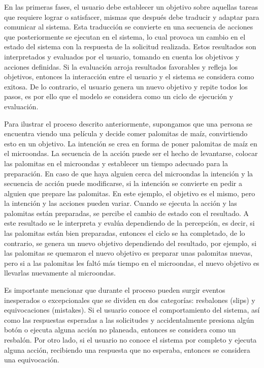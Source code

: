 En las primeras fases, el usuario debe establecer un objetivo sobre aquellas tareas que requiere lograr o satisfacer, mismas que después debe traducir y adaptar para comunicar al sistema. Esta traducción se convierte en una secuencia de acciones que posteriormente se ejecutan en el sistema, lo cual provoca un cambio en el estado del sistema con la respuesta de la solicitud realizada. Estos resultados son interpretados y evaluados por el usuario, tomando en cuenta los objetivos y acciones definidas. Si la evaluación arroja resultados favorables y refleja los objetivos, entonces la interacción entre el usuario y el sistema se considera como exitosa. De lo contrario, el usuario genera un nuevo objetivo y repite todos los pasos, es por ello que el modelo se considera como un ciclo de ejecución y evaluación.

Para ilustrar el proceso descrito anteriormente, supongamos que una persona se encuentra viendo una película y decide comer palomitas de maíz, convirtiendo esto en un objetivo. La intención se crea en forma de poner palomitas de maíz en el microondas. La secuencia de la acción puede ser el hecho de levantarse, colocar las palomitas en el microondas y establecer un tiempo adecuado para la preparación. En caso de que haya alguien cerca del microondas la intención y la secuencia de acción puede modificarse, si la intención se convierte en pedir a alguien que prepare las palomitas. En este ejemplo, el objetivo es el mismo, pero la intención y las acciones pueden variar. Cuando se ejecuta la acción y las palomitas están preparadas, se percibe el cambio de estado con el resultado. A este resultado se le interpreta y evalúa dependiendo de la percepción, es decir, si las palomitas están bien preparadas, entonces el ciclo se ha completado, de lo contrario, se genera un nuevo objetivo dependiendo del resultado, por ejemplo, si las palomitas se quemaron el nuevo objetivo es preparar unas palomitas nuevas, pero si a las palomitas les faltó más tiempo en el microondas, el nuevo objetivo es llevarlas nuevamente al microondas.

Es importante mencionar que durante el proceso pueden surgir eventos inesperados o excepcionales que se dividen en dos categorías: resbalones (slips) y equivocaciones (mistakes). Si el usuario conoce el comportamiento del sistema, así como las respuestas esperadas a las solicitudes y accidentalmente presiona algún botón o ejecuta alguna acción no planeada, entonces se considera como un resbalón. Por otro lado, si el usuario no conoce el sistema por completo y ejecuta alguna acción, recibiendo una respuesta que no esperaba, entonces se considera una equivocación.

